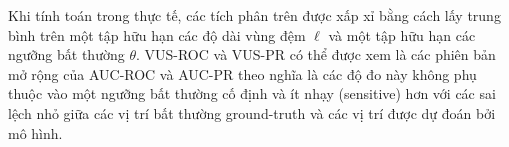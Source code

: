Khi tính toán trong thực tế, các tích phân trên được xấp xỉ bằng cách lấy trung bình trên một tập hữu hạn các độ dài vùng đệm \(\ell\) và một tập hữu hạn các ngưỡng bất thường \(\theta\).
VUS-ROC và VUS-PR có thể được xem là các phiên bản mở rộng của AUC-ROC và AUC-PR theo nghĩa là các độ đo này không phụ thuộc vào một ngưỡng bất thường cố định và ít nhạy (sensitive) hơn với các sai lệch nhỏ giữa các vị trí bất thường ground-truth và các vị trí được dự đoán bởi mô hình.